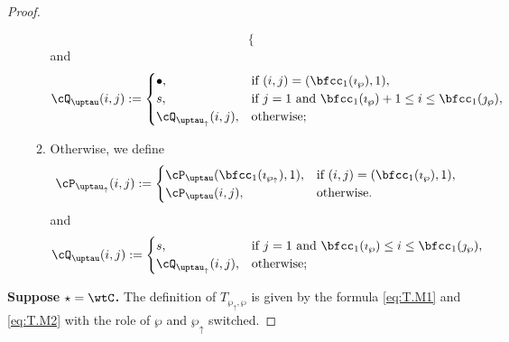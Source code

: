 \documentclass[12pt,a4paper]{amsart}
\numberwithin{equation}{section}
\theoremstyle{remark}
\def\wpu{\wp_{\uparrow}}
\def\wpd{\wp} %
\def\uptauu{\uptau_{\uparrow}}
\def\uptaud{\uptau} %
\begin{document}
\begin{proof}
\begin{enumerate}[label=(\alph*)]
\begin{enumerate}[label={\localtextbulletone}]
\[\begin{cases}
       \end{cases}
     \]
     and
     \[
       \cQ_{\uptaud}(i,j) := \begin{cases}
         \bullet ,& \text{if $(i,j)=(\bfcc_{1}(\imath_{\wpd}),1)$},\\
         s ,& \text{if $j=1$ and $\bfcc_{1}(\imath_{\wpd})+1\leq i \leq \bfcc_{1}(\jmath_{\wpd})$},\\
         \cQ_{\uptauu}(i,j) ,&\text{otherwise};
       \end{cases}
     \]
     \item Otherwise, we define
     \[
       \cP_{\uptauu}(i,j) := \begin{cases}
         \cP_{\uptaud}(\bfcc_{1}(\imath_{\wpu}),1), & \text{if $(i,j)=(\bfcc_{1}(\imath_{\wpd}),1)$},\\
         \cP_{\uptaud}(i,j) ,&\text{otherwise}.
       \end{cases}
     \]
     and
     \[
       \cQ_{\uptaud}(i,j) := \begin{cases}
         s ,& \text{if $j=1$ and $\bfcc_{1}(\imath_{\wpd})\leq i \leq \bfcc_{1}(\jmath_{\wpd})$},\\
         \cQ_{\uptauu}(i,j) ,&\text{otherwise};
       \end{cases}
     \]
   \end{enumerate}
 \end{enumerate}


  {\bfseries Suppose $\star = \wtC$.}
  The definition of $T_{\wpu,\wp}$ is given by the formula \eqref{eq:T.M1} and
  \eqref{eq:T.M2} with the
  role of $\wp$ and $\wpu$ switched.




\end{proof}
\end{document}
